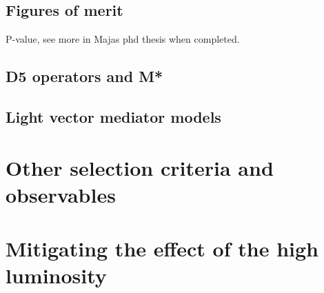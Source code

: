 \subsection{Figures of merit}
P-value, see more in Majas phd thesis when completed.
\subsection{D5 operators and M*}
\subsection{Light vector mediator models}
\section{Other selection criteria and observables}
\section{Mitigating the effect of the high luminosity}